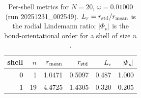 \begin{table}[t]
\centering
\small
\setlength{\tabcolsep}{4pt}
\renewcommand{\arraystretch}{1.15}
\begin{tabular}{r r r r r r}
\toprule
shell & $n$ & $r_{\rm mean}$ & $r_{\rm std}$ & $L_r$ & $|\Phi_n|$ \\
\midrule
0 & 1 & 1.0471 & 0.5097 & 0.487 & 1.000 \\
1 & 19 & 4.4725 & 1.4305 & 0.320 & 0.205 \\
\bottomrule
\end{tabular}
\caption{Per-shell metrics for $N=20$, $\omega=0.01000$ (run 20251231_002549). $L_r=r_{\rm std}/r_{\rm mean}$ is the radial Lindemann ratio; $|\Phi_n|$ is the bond-orientational order for a shell of size $n$.}
\end{table}